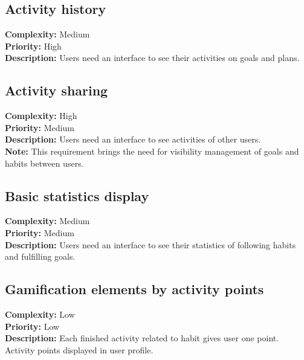 \subsection{Activity history}\label{subsec:activity-history}
\textbf{Complexity:} Medium\\
\textbf{Priority:} High\\
\textbf{Description:} Users need an interface to see their activities on goals and plans.\\


\subsection{Activity sharing}\label{subsec:activity-sharing}
\textbf{Complexity:} High\\
\textbf{Priority:} Medium\\
\textbf{Description:} Users need an interface to see activities of other users.\\
\textbf{Note:} This requirement brings the need for visibility management of goals and habits between users.\\


\subsection{Basic statistics display}\label{subsec:basic-statistic-display}
\textbf{Complexity:} Medium\\
\textbf{Priority:} Medium\\
\textbf{Description:} Users need an interface to see their statistics of following habits and fulfilling goals.\\


\subsection{Gamification elements by activity points}\label{subsec:gamification-elements-by-activity-points}
\textbf{Complexity:} Low\\
\textbf{Priority:} Low\\
\textbf{Description:} Each finished activity related to habit gives user one point.
Activity points displayed in user profile.\\